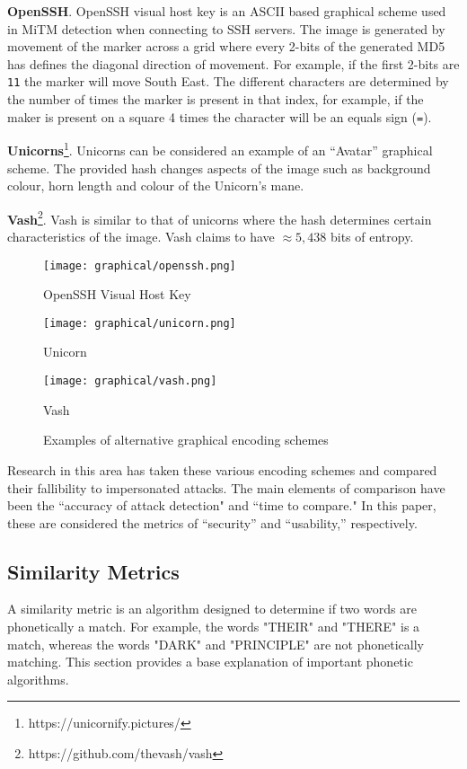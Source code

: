 \textbf{OpenSSH}. OpenSSH visual host key is an ASCII based graphical scheme used in MiTM detection when connecting to SSH servers. The image is generated by movement of the marker across a grid where every 2-bits of the generated MD5 has defines the diagonal direction of movement. For example, if the first 2-bits are \verb|11| the marker will move South East. The different characters are determined by the number of times the marker is present in that index, for example, if the maker is present on a square 4 times the character will be an equals sign (\verb|=|).

\textbf{Unicorns}\footnote{https://unicornify.pictures/}. Unicorns can be considered an example of an ``Avatar'' graphical scheme. The provided hash changes aspects of the image such as background colour, horn length and colour of the Unicorn's mane.

\textbf{Vash}\footnote{https://github.com/thevash/vash}. Vash is similar to that of unicorns where the hash determines certain characteristics of the image. Vash claims to have $\approx 5,438$ bits of entropy.

\begin{figure}[h!]
    \centering
        \texttt{[image: graphical/openssh.png]}
        \caption{OpenSSH Visual Host Key}
    \endminipage
        \texttt{[image: graphical/unicorn.png]}
        \caption{Unicorn}
    \endminipage
        \texttt{[image: graphical/vash.png]}
        \caption{Vash}
    \endminipage
    \caption{Examples of alternative graphical encoding schemes}
\end{figure}

Research in this area has taken these various encoding schemes and compared their fallibility to impersonated attacks. The main elements of comparison have been the ``accuracy of attack detection" and ``time to compare." In this paper, these are considered the metrics of ``security'' and ``usability,'' respectively.

\subsection{Similarity Metrics}
\label{sec:similarity_metric}
A similarity metric is an algorithm designed to determine if two words are phonetically a match. For example, the words "THEIR" and "THERE" is a match, whereas the words "DARK" and "PRINCIPLE" are not phonetically matching. This section provides a base explanation of important phonetic algorithms.


